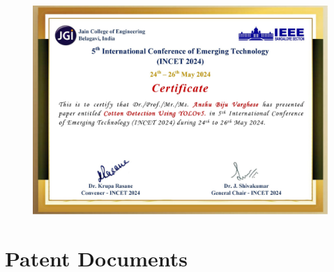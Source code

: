 \documentclass[12pt,a4paper]{report}
\begin{document}
\begin{figure}[!htb]
\begin{center}
\includegraphics[scale=0.5]{images/certificates/certificates/1477_Anshu Biju Varghese_page-0001.jpg}
\end{center}
\end{figure} 







\section {Patent Documents}
\end{document}
